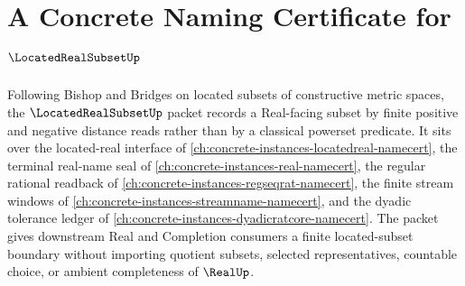 \chapter{A Concrete Naming Certificate for $\LocatedRealSubsetUp$}
\label{ch:concrete-instances-located-real-subset-namecert}

Following Bishop and Bridges on located subsets of constructive metric spaces, the $\LocatedRealSubsetUp$ packet records a Real-facing subset by finite positive and negative distance reads rather than by a classical powerset predicate. It sits over the located-real interface of \autoref{ch:concrete-instances-locatedreal-namecert}, the terminal real-name seal of \autoref{ch:concrete-instances-real-namecert}, the regular rational readback of \autoref{ch:concrete-instances-regseqrat-namecert}, the finite stream windows of \autoref{ch:concrete-instances-streamname-namecert}, and the dyadic tolerance ledger of \autoref{ch:concrete-instances-dyadicratcore-namecert}. The packet gives downstream Real and Completion consumers a finite located-subset boundary without importing quotient subsets, selected representatives, countable choice, or ambient completeness of $\RealUp$.

